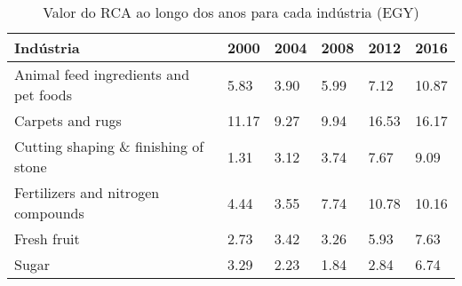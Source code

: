 \begin{table}
\centering
\caption{Valor do RCA ao longo dos anos para cada indústria (EGY)}
\begin{tabular}{p{6cm}p{1.5cm}p{1.5cm}p{1.5cm}p{1.5cm}p{1.5cm}}
\toprule
                            Indústria &  2000 & 2004 & 2008 &  2012 &  2016 \\
\midrule
Animal feed ingredients and pet foods &  5.83 & 3.90 & 5.99 &  7.12 & 10.87 \\
                     Carpets and rugs & 11.17 & 9.27 & 9.94 & 16.53 & 16.17 \\
 Cutting shaping \& finishing of stone &  1.31 & 3.12 & 3.74 &  7.67 &  9.09 \\
   Fertilizers and nitrogen compounds &  4.44 & 3.55 & 7.74 & 10.78 & 10.16 \\
                          Fresh fruit &  2.73 & 3.42 & 3.26 &  5.93 &  7.63 \\
                                Sugar &  3.29 & 2.23 & 1.84 &  2.84 &  6.74 \\
\bottomrule
\end{tabular}
\end{table}
